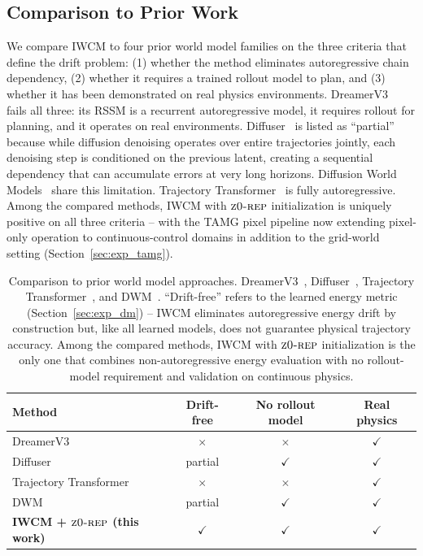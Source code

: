 \documentclass[12pt]{article}
\newcommand{\zrep}{\textsc{z0-rep}}
\begin{document}
\subsection{Comparison to Prior Work}

We compare IWCM to four prior world model families on the three criteria that define the drift problem: (1) whether the method eliminates autoregressive chain dependency, (2) whether it requires a trained rollout model to plan, and (3) whether it has been demonstrated on real physics environments. DreamerV3~\citep{hafner2023dreamerv3} fails all three: its RSSM is a recurrent autoregressive model, it requires rollout for planning, and it operates on real environments. Diffuser~\citep{janner2022diffuser} is listed as ``partial'' because while diffusion denoising operates over entire trajectories jointly, each denoising step is conditioned on the previous latent, creating a sequential dependency that can accumulate errors at very long horizons. Diffusion World Models~\citep{ding2024diffusion} share this limitation. Trajectory Transformer~\citep{janner2021offline} is fully autoregressive. Among the compared methods, IWCM with $\zrep$ initialization is uniquely positive on all three criteria -- with the TAMG pixel pipeline now extending pixel-only operation to continuous-control domains in addition to the grid-world setting (Section~\ref{sec:exp_tamg}).

\begin{table}[h]
\centering
\caption{Comparison to prior world model approaches. DreamerV3~\citep{hafner2023dreamerv3}, Diffuser~\citep{janner2022diffuser}, Trajectory Transformer~\citep{janner2021offline}, and DWM~\citep{ding2024diffusion}. ``Drift-free'' refers to the learned energy metric (Section~\ref{sec:exp_dm}) -- IWCM eliminates autoregressive energy drift by construction but, like all learned models, does not guarantee physical trajectory accuracy. Among the compared methods, IWCM with $\zrep$ initialization is the only one that combines non-autoregressive energy evaluation with no rollout-model requirement and validation on continuous physics.}
\label{tab:comparison}
\begin{tabular}{@{}lccc@{}}
\toprule
Method & Drift-free & No rollout model & Real physics \\
\midrule
DreamerV3 & $\times$ & $\times$ & $\checkmark$ \\
Diffuser & partial & $\checkmark$ & $\checkmark$ \\
Trajectory Transformer & $\times$ & $\times$ & $\checkmark$ \\
DWM & partial & $\checkmark$ & $\checkmark$ \\
\textbf{IWCM + $\zrep$ (this work)} & $\mathbf{\checkmark}$ & $\mathbf{\checkmark}$ & $\mathbf{\checkmark}$ \\
\bottomrule
\end{tabular}
\end{table}
\end{document}
